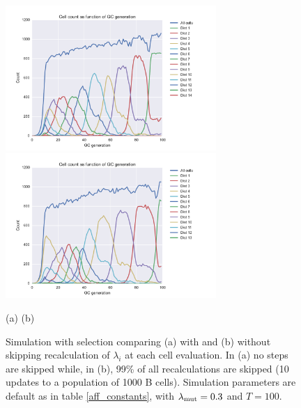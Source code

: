 \begin{figure}[!ht]
\begin{center}
\includegraphics[width=80mm]{figures/sim_selection_default_run_dist10.pdf}
\hspace{-22mm}
\includegraphics[width=80mm]{figures/sim_selection_default_run_dist10_no_skip.pdf} \newline%
\end{center}
\vspace{-9mm} \hspace{34mm} (a) \hspace{53mm} (b)
    \caption{
        \label{fig:skip_vs_no_skip_dist10}
        Simulation with selection comparing (a) with and (b) without skipping recalculation of $\lambda_i$ at each cell evaluation. In (a) no steps are skipped while, in (b), 99\% of all recalculations are skipped (10 updates to a population of 1000 B cells). Simulation parameters are default as in table \ref{aff_constants}, with $\lambda_{\text{mut}} = 0.3$ and $T=100$.
        }
\end{figure}

